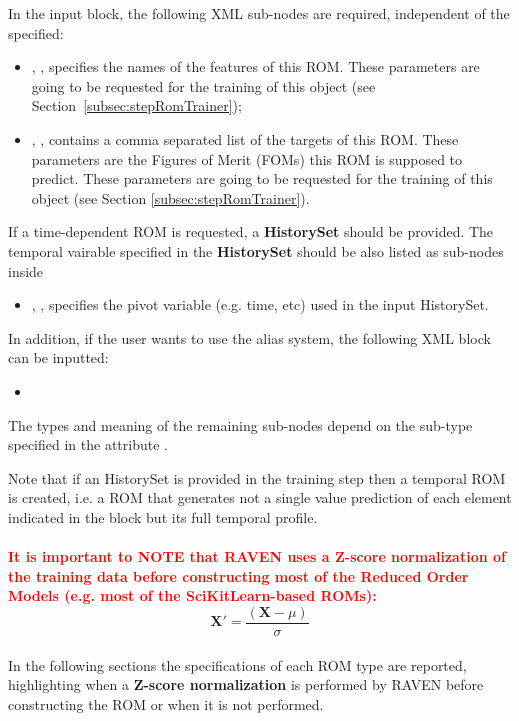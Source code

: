 In the  input block, the following XML sub-nodes are required,
independent of the  specified:
%
\begin{itemize}
   \item {}, ,
     specifies the names of the features of this ROM.
   \nb These parameters are going to be requested for the training of this object
    (see Section~\ref{subsec:stepRomTrainer});
    \item {}, ,
      contains a comma separated list of the targets of this ROM. These parameters
      are the Figures of Merit (FOMs) this ROM is supposed to predict.
    \nb These parameters are going to be requested for the training of this
    object (see Section \ref{subsec:stepRomTrainer}).
\end{itemize}

If a time-dependent ROM is requested, a \textbf{HistorySet} should be provided.
The temporal vairable specified in the \textbf{HistorySet} should be also listed
as sub-nodes inside 
%
\begin{itemize}
  \item {}, , specifies the pivot
    variable (e.g. time, etc) used in the input HistorySet.
\end{itemize}
%
In addition, if the user wants to use the alias system, the following XML block can be inputted:
\begin{itemize}
  \item {}
\end{itemize}


The types and meaning of the remaining sub-nodes depend on the sub-type
specified in the attribute .

%
Note that if an HistorySet is provided in the training step then a temporal ROM is created, i.e. a ROM that generates not a single value prediction of each element indicated in the   block but its full temporal profile.
\\
\textcolor{red}{\\\textbf{It is important to NOTE that RAVEN uses a Z-score normalization of the training data before constructing most of the
Reduced Order Models (e.g. most of the SciKitLearn-based ROMs):}}
\begin{equation}
  \mathit{\mathbf{X'}} = \frac{(\mathit{\mathbf{X}}-\mu )}{\sigma }
\end{equation}
\\In the following sections the specifications of each ROM type are reported, highlighting when a \textbf{Z-score normalization} is performed by RAVEN before constructing the ROM or when it is not performed.

